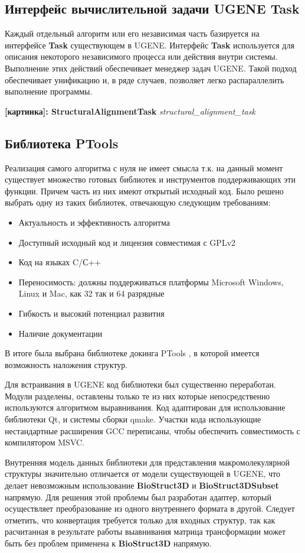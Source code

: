 \documentclass[a4paper, 12pt, titlepage, utf8]{extarticle}
\newcommand{\class}{\textbf}
\newcommand{\myimage}[2]{   
    \begin{center} \textbf{[картинка]: #1} \textit{#2} \end{center} 
}
\begin{document}
\subsection{Интерфейс вычислительной задачи UGENE Task}
Каждый отдельный алгоритм или его независимая часть базируется на интерфейсе \class{Task} существующем в UGENE. Интерфейс \class{Task} используется для описания некоторого независимого процесса или действия внутри системы. Выполнение этих действий обеспечивает менеджер задач UGENE. Такой подход обеспечивает унификацию и, в ряде случаев, позволяет легко распараллелить выполнение программы.

\myimage{StructuralAlignmentTask}{structural\_alignment\_task}

\subsection{Библиотека PTools}
Реализация самого алгоритма с нуля не имеет смысла т.к. на данный момент существует множество готовых библиотек и инструментов поддерживающих эти функции. Причем часть из них имеют открытый исходный код. Было решено выбрать одну из таких библиотек, отвечающую следующим требованиям:

\begin{itemize}
    \item Актуальность и эффективность алгоритма
    \item Доступный исходный код и лицензия совместимая с GPLv2 \cite{gpl}
    \item Код на языках C/С++
    \item Переносимость: должны поддерживаться платформы Microsoft Windows, Linux и Mac, как 32 так и 64 разрядные
    \item Гибкость и высокий потенциал развития
    \item Наличие документации
\end{itemize}

В итоге была выбрана библиотеке докинга PTools \cite{ptools}, в которой имеется возможность наложения структур. 

Для встраивания в UGENE код библиотеки был существенно переработан. Модули разделены, оставлены только те из них которые непосредственно используются алгоритмом выравнивания. Код адаптирован для использование библиотеки Qt, и системы сборки qmake. Участки кода использующие нестандартные расширения GCC переписаны, чтобы обеспечить совместимость с компилятором MSVC.

Внутренняя модель данных библиотеки для представления макромолекулярной структуры значительно отличается от модели существующей в UGENE, что делает невозможным использование \class{BioStruct3D} и \class{BioStruct3DSubset} напрямую. Для решения этой проблемы был разработан адаптер, который осуществляет преобразование из одного внутреннего формата в другой. Следует отметить, что конвертация требуется только для входных структур, так как расчитанная в результате работы выавнивания матрица трансформации может быть без проблем применена к \class{BioStruct3D} напрямую.
\end{document}
